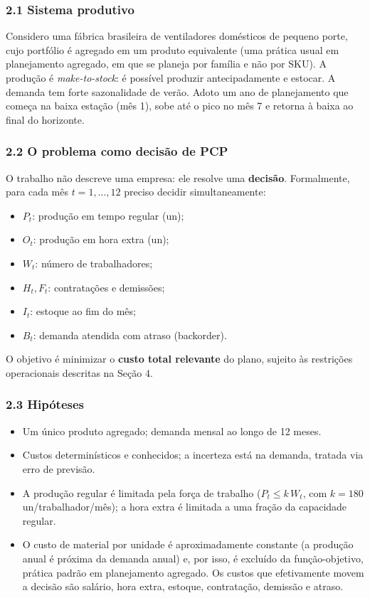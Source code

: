 \documentclass[
  brazilian,
  12pt,
]{article}
\providecommand{\tightlist}{%
  \setlength{\itemsep}{0pt}\setlength{\parskip}{0pt}}
\begin{document}
\subsubsection{2.1 Sistema produtivo}\label{sistema-produtivo}

Considero uma fábrica brasileira de ventiladores domésticos de pequeno
porte, cujo portfólio é agregado em um produto equivalente (uma prática
usual em planejamento agregado, em que se planeja por família e não por
SKU). A produção é \emph{make-to-stock}: é possível produzir
antecipadamente e estocar. A demanda tem forte sazonalidade de verão.
Adoto um ano de planejamento que começa na baixa estação (mês 1), sobe
até o pico no mês 7 e retorna à baixa ao final do horizonte.

\subsubsection{2.2 O problema como decisão de
PCP}\label{o-problema-como-decisuxe3o-de-pcp}

O trabalho não descreve uma empresa: ele resolve uma \textbf{decisão}.
Formalmente, para cada mês \(t = 1,\dots,12\) preciso decidir
simultaneamente:

\begin{itemize}
\tightlist
\item
  \(P_t\): produção em tempo regular (un);
\item
  \(O_t\): produção em hora extra (un);
\item
  \(W_t\): número de trabalhadores;
\item
  \(H_t, F_t\): contratações e demissões;
\item
  \(I_t\): estoque ao fim do mês;
\item
  \(B_t\): demanda atendida com atraso (backorder).
\end{itemize}

O objetivo é minimizar o \textbf{custo total relevante} do plano,
sujeito às restrições operacionais descritas na Seção 4.

\subsubsection{2.3 Hipóteses}\label{hipuxf3teses}

\begin{itemize}
\tightlist
\item
  Um único produto agregado; demanda mensal ao longo de 12 meses.
\item
  Custos determinísticos e conhecidos; a incerteza está na demanda,
  tratada via erro de previsão.
\item
  A produção regular é limitada pela força de trabalho
  (\(P_t \le k\,W_t\), com \(k = 180\) un/trabalhador/mês); a hora extra
  é limitada a uma fração da capacidade regular.
\item
  O custo de material por unidade é aproximadamente constante (a
  produção anual é próxima da demanda anual) e, por isso, é excluído da
  função-objetivo, prática padrão em planejamento agregado. Os custos
  que efetivamente movem a decisão são salário, hora extra, estoque,
  contratação, demissão e atraso.
\end{itemize}
\end{document}
